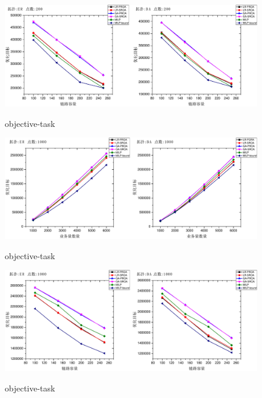  \begin{figure}
\setlength{\belowcaptionskip}{-0.1cm}
  \begin{center}
    {\includegraphics[width=1 \textwidth]{figures/OB-CA-200.pdf}}
    \end{center}
  \caption{{\footnotesize{objective-task}}}
  \label{IterNum}
\end{figure}
 \begin{figure}
\setlength{\belowcaptionskip}{-0.1cm}
  \begin{center}
    {\includegraphics[width=1  \textwidth]{figures/OB-TA.pdf}}
    \end{center}
  \caption{{\footnotesize{objective-task}}}
  \label{IterNum}
\end{figure}
  \begin{figure}
\setlength{\belowcaptionskip}{-0.1cm}
  \begin{center}
    {\includegraphics[width=1 \textwidth]{figures/OB-CA.pdf}}
    \end{center}
  \caption{{\footnotesize{objective-task}}}
  \label{IterNum}
\end{figure}
